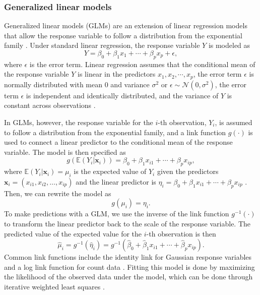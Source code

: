 \subsubsection{Generalized linear models}
Generalized linear models (GLMs) are an extension of linear regression models that allow the response variable to follow a distribution from the exponential family \parencite{nelder1972}. Under standard linear regression, the response variable \(Y\) is modeled as 
\[ Y = \beta_0 + \beta_1 x_1 + \cdots + \beta_p x_p + \epsilon, \]
where \(\epsilon\) is the error term. Linear regression assumes that the conditional mean of the response variable \(Y\) is linear in the predictors \(x_1, x_2, \cdots, x_p\), the error term \(\epsilon\) is normally distributed with mean 0 and variance \(\sigma^2\) or \(\epsilon \sim \mathcal{N}(0, \sigma^2)\), the error term \(\epsilon\) is independent and identically distributed, and the variance of \(Y\) is constant across observations \parencite{guisan2002}.

In GLMs, however, the response variable for the \(i\)-th observation, \(Y_i\), is assumed to follow a distribution from the exponential family, and a link function \(g(\cdot)\) is used to connect a linear predictor to the conditional mean of the response variable. The model is then specified as
\[g(\mathbb{E}(Y_i| \mathbf{x}_i)) = \beta_0 + \beta_1 x_{i1} + \cdots + \beta_p x_{ip},\]
where \(\mathbb{E}(Y_i|\mathbf{x}_i) = \mu_i\) is the expected value of \(Y_i\) given the predictors \(\mathbf{x}_i = (x_{i1}, x_{i2}, \ldots, x_{ip})\) and the linear predictor is \(\eta_i = \beta_0 + \beta_1 x_{i1} + \cdots + \beta_p x_{ip}\) \parencite{guisan2002}. Then, we can rewrite the model as
\[g(\mu_i) = \eta_i.\]
To make predictions with a GLM, we use the inverse of the link function \(g^{-1}(\cdot)\) to transform the linear predictor back to the scale of the response variable. The predicted value of the expected value for the \(i\)-th observation is then
\[
\hat{\mu}_i = g^{-1}(\hat{\eta}_i)
= g^{-1}(\hat{\beta}_0 + \hat{\beta}_1 x_{i1} + \cdots + \hat{\beta}_p x_{ip}).
\]
Common link functions include the identity link for Gaussian response variables \parencite{guisan2002} and a log link function for count data \parencite{cai2023}. Fitting this model is done by maximizing the likelihood of the observed data under the model, which can be done through iterative weighted least squares \parencite{nelder1972, guisan2002}.

